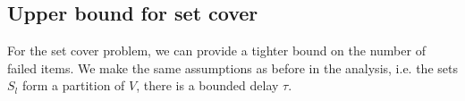 





\subsection{Upper bound for set cover}

For the set cover problem, we can provide a tighter bound on the number of failed items.
We make the same assumptions as before in the \hogwild{} analysis, i.e. the sets $S_l$ form a partition of $V$, there is a bounded delay $\tau$.

